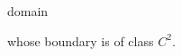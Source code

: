 \documentclass[11pt,a4paper]{amsart}
\numberwithin{equation}{section}
\begin{document}
domain {whose boundary is of class $C^2$.





%
%


}
\end{document}
